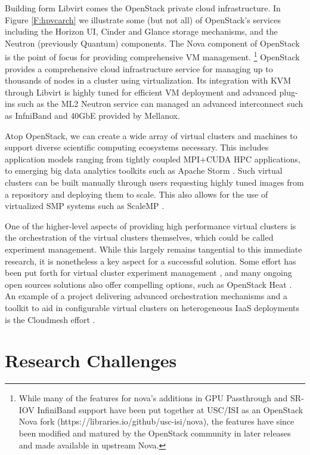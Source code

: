 Building form Libvirt comes the OpenStack private cloud infrastructure. In Figure \ref{F:hpvcarch} we illustrate some (but not all) of OpenStack's services including the Horizon UI, Cinder and Glance storage mechanisms, and the Neutron (previously Quantum) components. The Nova component of OpenStack is the point of focus for providing comprehensive VM management.
\footnote{While many of the features for nova's additions in GPU Passthrough and SR-IOV InfiniBand support have been put together at USC/ISI as an OpenStack Nova fork (https://libraries.io/github/usc-isi/nova), the features have since been modified and matured by the OpenStack community in later releases and made available in upstream Nova.}  OpenStack provides a comprehensive cloud infrastructure service for managing up to thousands of nodes in a cluster using virtualization. Its integration with KVM through Libvirt is highly tuned for efficient  VM deployment and advanced plug-ins such as the ML2 Neutron service can managed an advanced interconnect such as InfniBand and 40GbE provided by Mellanox. 

Atop OpenStack, we can create a wide array of virtual clusters and machines to support diverse scientific computing ecosystems necessary. This includes application models ranging from tightly coupled MPI+CUDA HPC applications, to emerging big data analytics toolkits such as Apache Storm \cite{kamburugamuve2016streaming}. Such virtual clusters can be built manually through users requesting highly tuned images from a repository and deploying them to scale. This also allows for the use of virtualized SMP systems such as ScaleMP \cite{Younge2016smp}.

One of the higher-level aspects of providing high performance virtual clusters is the orchestration of the virtual clusters themselves, which could be called experiment management. While this largely remains tangential to this immediate research, it is nonetheless a key aspect for a successful solution. Some effort has been put forth for virtual cluster experiment management \cite{las2010gce}, and many ongoing open sources solutions also offer compelling options, such as OpenStack Heat \cite{www-openstack-heat}.  An example of a project delivering advanced orchestration mechanisms and a toolkit to aid in configurable virtual clusters on heterogeneous IaaS deployments is the Cloudmesh effort \cite{von2014cloudmesh}.  


\section{Research Challenges}
\label{sec:chall}

